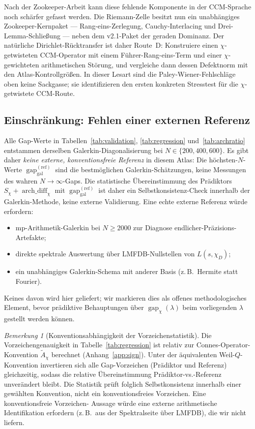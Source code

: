 \documentclass[a4paper,10pt,twocolumn]{article}
\theoremstyle{definition}
\theoremstyle{remark}
\newtheorem{remark}[theorem]{Bemerkung}
\newcommand{\gap}{\operatorname{gap}}
\newcommand{\chifn}{\chi}
\newcommand{\archdiff}{\operatorname{arch\_diff}}
\begin{document}
Nach der Zookeeper-Arbeit \cite{Zookeeper2026} kann diese fehlende
Komponente in der CCM-Sprache noch schärfer gefasst werden. Die Riemann-Zelle
besitzt nun ein unabhängiges Zookeeper-Kernpaket --- Rang-eins-Zerlegung,
Cauchy-Interlacing und Drei-Lemma-Schließung --- neben
dem v2.1-Paket der geraden Dominanz. Der natürliche Dirichlet-Rücktransfer
ist daher Route~D: Konstruiere einen $\chifn$-getwisteten CCM-Operator mit
einem Führer-Rang-eins-Term und einer $\chifn$-gewichteten arithmetischen
Störung, und vergleiche dann dessen Defektnorm mit den Atlas-Kontrollgrößen.
In dieser Lesart sind die Paley-Wiener-Fehlschläge oben keine
Sackgasse; sie identifizieren den ersten konkreten Stresstest für die
$\chifn$-getwistete CCM-Route.

\subsection{Einschränkung: Fehlen einer externen Referenz}
\label{sec:limitation-external}

Alle Gap-Werte in Tabellen~\ref{tab:validation}, \ref{tab:regression}
und~\ref{tab:archratio} entstammen derselben Galerkin-Diagonalisierung
bei $N\in\{200,400,600\}$. Es gibt daher \emph{keine externe,
konventionsfreie Referenz} in diesem Atlas: Die höchsten-$N$-Werte
$\gap_{\mathrm{gal}}^{(\mathrm{ref})}$ sind die bestmöglichen
Galerkin-Schätzungen, keine Messungen des wahren $N\to\infty$-Gaps.
Die statistische Übereinstimmung des Prädiktors $S_\chi+\archdiff_\chi$
mit $\gap_{\mathrm{gal}}^{(\mathrm{ref})}$ ist daher ein
Selbstkonsistenz-Check innerhalb der Galerkin-Methode, keine externe
Validierung. Eine echte externe Referenz würde erfordern:
\begin{itemize}
\item[(i)] mp-Arithmetik-Galerkin bei $N\geq 2000$ zur Diagnose
  endlicher-Präzisions-Artefakte;
\item[(ii)] direkte spektrale Auswertung über LMFDB-Nullstellen von
  $L(s,\chi_D)$;
\item[(iii)] ein unabhängiges Galerkin-Schema mit anderer Basis (z.\,B.\
  Hermite statt Fourier).
\end{itemize}
Keines davon wird hier geliefert; wir markieren dies als offenes
methodologisches Element, bevor prädiktive Behauptungen über
$\gap_{\chifn}(\lambda)$ beim vorliegenden $\lambda$ gestellt werden
können.

\begin{remark}[Konventionsabhängigkeit der Vorzeichenstatistik]
\label{rem:sign-convention-dependence}
Die Vorzeichengenauigkeit in Tabelle~\ref{tab:regression} ist relativ
zur Connes-Operator-Konvention $\tilde{A}_\chi$ berechnet
(Anhang~\ref{app:sign}). Unter der äquivalenten Weil-$Q$-Konvention
invertieren sich alle Gap-Vorzeichen (Prädiktor und Referenz)
gleichzeitig, sodass die relative Übereinstimmung
Prädiktor-vs.-Referenz unverändert bleibt. Die Statistik prüft
folglich Selbstkonsistenz innerhalb einer gewählten Konvention, nicht
ein konventionsfreies Vorzeichen. Eine konventionsfreie Vorzeichen-
Aussage würde eine externe arithmetische Identifikation erfordern
(z.\,B.\ aus der Spektralseite über LMFDB), die wir nicht liefern.
\end{remark}
\end{document}
